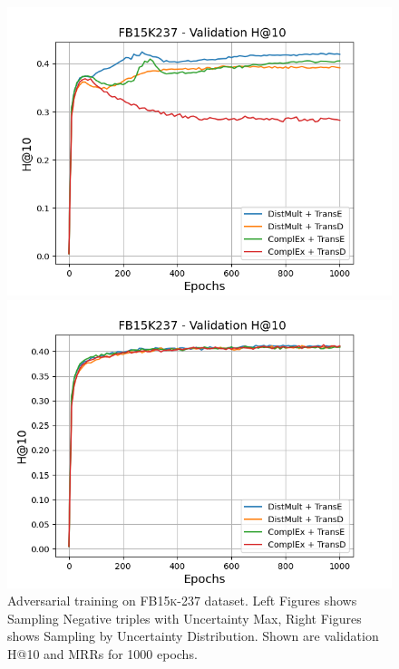 \begin{figure}[H]
\begin{minipage}{.5\textwidth}
    \end{minipage}
    \begin{minipage}{.5\textwidth}
      \centering
      \includegraphics[width=0.9\linewidth]{figures/results/gan_train/not_pretrained/uncertainty/max/entropy/fb15k237/1k_epochs/uncertainty_fb15k237_hit10.png}
    \end{minipage}%
    \begin{minipage}{.5\textwidth}
      \centering
      \includegraphics[width=0.9\linewidth]{figures/results/gan_train/not_pretrained/uncertainty/max_distribution/entropy/fb15k237/1k_epochs/uncertainty_fb15k237_hit10.png}
    \end{minipage}%
    \caption{Adversarial training on \textsc{FB15k-237} dataset. 
    Left Figures shows Sampling Negative triples with Uncertainty Max, Right Figures shows Sampling by Uncertainty Distribution.
    Shown are validation H@10 and MRRs for 1000 epochs.}
    \label{fig:advtrain_fb15k237_usmax_ussoftmax}
\end{figure}
